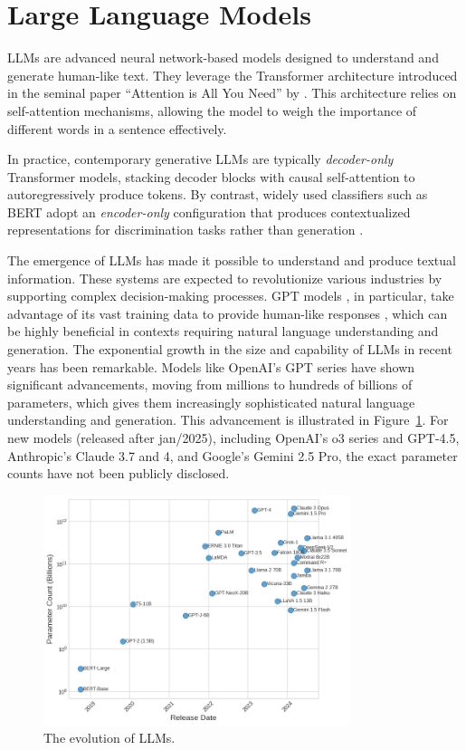     \section{Large Language Models}         

        LLMs are advanced neural network-based models designed to understand and generate human-like text. 
        They leverage the Transformer architecture introduced in the seminal paper \enquote{Attention is All You Need} by \citet{Vaswani2017}. 
        This architecture relies on self-attention mechanisms, allowing the model to weigh the importance of different words in a sentence effectively. 

        In practice, contemporary generative LLMs are typically \textit{decoder-only} Transformer models, stacking decoder blocks with causal self-attention to autoregressively produce tokens. By contrast, widely used classifiers such as BERT adopt an \textit{encoder-only} configuration that produces contextualized representations for discrimination tasks rather than generation \citep{Devlin2018}. 

        The emergence of LLMs has made it possible to understand and produce textual information. 
        These systems are expected to revolutionize various industries by supporting complex decision-making processes. GPT models \citep{OpenAI2023}, in particular, take advantage of its vast training data to provide human-like responses \citep{Mosser2024}, which can be highly beneficial in contexts requiring natural language understanding and generation. The exponential growth in the size and capability of LLMs in recent years has been remarkable. Models like OpenAI's GPT series have shown significant advancements, moving from millions to hundreds of billions of parameters, which gives them increasingly sophisticated natural language understanding and generation. This advancement is illustrated in Figure~\ref{fig:llm_evolution}. For new models (released after jan/2025), including OpenAI's o3 series and GPT-4.5, Anthropic's Claude 3.7 and 4, and Google's Gemini 2.5 Pro, the exact parameter counts have not been publicly disclosed. 

        \begin{figure}[ht]
            \centering
            \includegraphics[width=0.8\textwidth]{images/llm_evolution.png}
            \caption{The evolution of LLMs.}
            \label{fig:llm_evolution}
        \end{figure}
                
